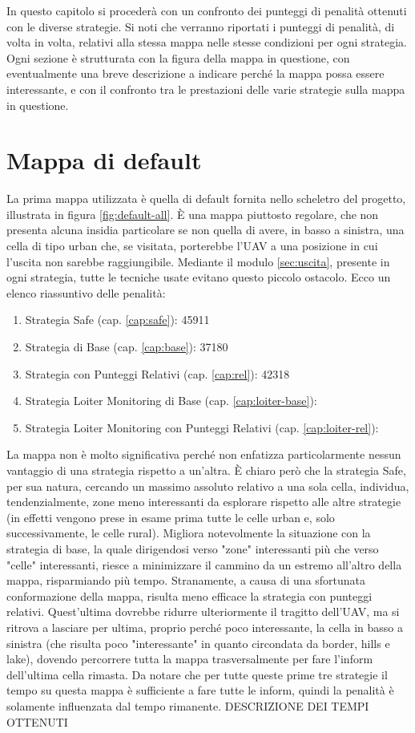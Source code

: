 In questo capitolo si procederà con un confronto dei punteggi di penalità ottenuti con le diverse strategie. Si noti che verranno riportati i punteggi di penalità, di volta in volta, relativi alla stessa mappa nelle stesse condizioni per ogni strategia. Ogni sezione è strutturata con la figura della mappa in questione, con eventualmente una breve descrizione a indicare perché la mappa possa essere interessante, e con il confronto tra le prestazioni delle varie strategie sulla mappa in questione.

\section{Mappa di default}
La prima mappa utilizzata è quella di default fornita nello scheletro del progetto, illustrata in figura \ref{fig:default-all}. È una mappa piuttosto regolare, che non presenta alcuna insidia particolare se non quella di avere, in basso a sinistra, una cella di tipo urban che, se visitata, porterebbe l'UAV a una posizione in cui l'uscita non sarebbe raggiungibile. Mediante il modulo \ref{sec:uscita}, presente in ogni strategia, tutte le tecniche usate evitano questo piccolo ostacolo. Ecco un elenco riassuntivo delle penalità:
\begin{enumerate}
	\item Strategia Safe (cap. \ref{cap:safe}): 45911
	\item Strategia di Base (cap. \ref{cap:base}): 37180
	\item Strategia con Punteggi Relativi (cap. \ref{cap:rel}): 42318
	\item Strategia Loiter Monitoring di Base (cap. \ref{cap:loiter-base}):
	\item Strategia Loiter Monitoring con Punteggi Relativi (cap. \ref{cap:loiter-rel}):
\end{enumerate}

La mappa non è molto significativa perché non enfatizza particolarmente nessun vantaggio di una strategia rispetto a un'altra. È chiaro però che la strategia Safe, per sua natura, cercando un massimo assoluto relativo a una sola cella, individua, tendenzialmente, zone meno interessanti da esplorare rispetto alle altre strategie (in effetti vengono prese in esame prima tutte le celle urban e, solo successivamente, le celle rural). Migliora notevolmente la situazione con la strategia di base, la quale dirigendosi verso "zone" interessanti più che verso "celle" interessanti, riesce a minimizzare il cammino da un estremo all'altro della mappa, risparmiando più tempo.
Stranamente, a causa di una sfortunata conformazione della mappa, risulta meno efficace la strategia con punteggi relativi. Quest'ultima dovrebbe ridurre ulteriormente il tragitto dell'UAV, ma si ritrova a lasciare per ultima, proprio perché poco interessante, la cella in basso a sinistra (che risulta poco "interessante" in quanto circondata da border, hills e lake), dovendo percorrere tutta la mappa trasversalmente per fare l'inform dell'ultima cella rimasta. Da notare che per tutte queste prime tre strategie il tempo su questa mappa è sufficiente a fare tutte le inform, quindi la penalità è solamente influenzata dal tempo rimanente.
{\color{red}  DESCRIZIONE DEI TEMPI OTTENUTI}


